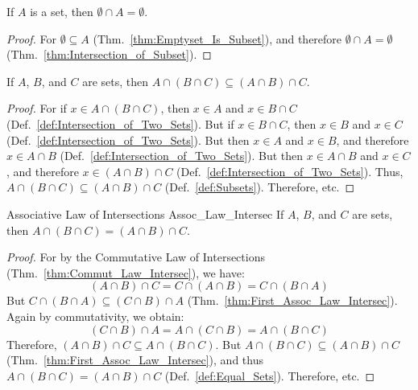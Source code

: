         \begin{theorem}
            If $A$ is a set, then
            $\emptyset\cap{A}=\emptyset$.
        \end{theorem}
        \begin{proof}
            For $\emptyset\subseteq{A}$
            (Thm.~\ref{thm:Emptyset_Is_Subset}), and
            therefore $\emptyset\cap{A}=\emptyset$
            (Thm.~\ref{thm:Intersection_of_Subset}).
        \end{proof}
        \begin{theorem}
            \label{thm:First_Assoc_Law_Intersec}%
            If $A$, $B$, and $C$ are sets, then
            $A\cap(B\cap{C})\subseteq(A\cap{B})\cap{C}$.
        \end{theorem}
        \begin{proof}
            For if $x\in{A}\cap(B\cap{C})$, then $x\in{A}$
            and $x\in{B}\cap{C}$
            (Def.~\ref{def:Intersection_of_Two_Sets}). But if
            $x\in{B}\cap{C}$, then $x\in{B}$ and $x\in{C}$
            (Def.~\ref{def:Intersection_of_Two_Sets}). But then
            $x\in{A}$ and $x\in{B}$, and therefore
            $x\in{A}\cap{B}$
            (Def.~\ref{def:Intersection_of_Two_Sets}). But
            then $x\in{A}\cap{B}$ and $x\in{C}$, and
            therefore $x\in(A\cap{B})\cap{C}$
            (Def.~\ref{def:Intersection_of_Two_Sets}). Thus,
            $A\cap(B\cap{C})\subseteq(A\cap{B})\cap{C}$
            (Def.~\ref{def:Subsets}). Therefore, etc.
        \end{proof}
        \begin{ltheorem}{Associative Law of Intersections}
              {Assoc_Law_Intersec}
            If $A$, $B$, and $C$ are sets, then
            $A\cap(B\cap{C})=(A\cap{B})\cap{C}$.
        \end{ltheorem}
        \begin{proof}
            For by the Commutative Law of Intersections
            (Thm.~\ref{thm:Commut_Law_Intersec}),
            we have:
            \begin{equation}
                (A\cap{B})\cap{C}=C\cap(A\cap{B})
                                 =C\cap(B\cap{A})
            \end{equation}
            But $C\cap(B\cap{A})\subseteq(C\cap{B})\cap{A}$
            (Thm.~\ref{thm:First_Assoc_Law_Intersec}).
            Again by commutativity, we obtain:
            \begin{equation}
                (C\cap{B})\cap{A}=A\cap(C\cap{B})
                                 =A\cap(B\cap{C})
            \end{equation}
            Therefore,
            $(A\cap{B})\cap{C}\subseteq{A}\cap(B\cap{C})$.
            But $A\cap(B\cap{C})\subseteq(A\cap{B})\cap{C}$
            (Thm.~\ref{thm:First_Assoc_Law_Intersec}),
            and thus $A\cap(B\cap{C})=(A\cap{B})\cap{C}$
            (Def.~\ref{def:Equal_Sets}). Therefore, etc.
        \end{proof}
